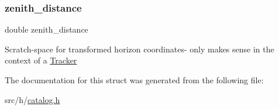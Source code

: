 \mbox{\label{struct_entry_a3c2f9054e85abef611e387ff641fe831}} 
\subsubsection{\texorpdfstring{zenith\+\_\+distance}{zenith\_distance}}
{\footnotesize\ttfamily double zenith\+\_\+distance}

Scratch-\/space for transformed horizon coordinates-\/ only makes sense in the context of a \mbox{\hyperlink{struct_tracker}{Tracker}} 

The documentation for this struct was generated from the following file\+:\begin{DoxyCompactItemize}
\item 
src/h/\mbox{\hyperlink{catalog_8h}{catalog.\+h}}\end{DoxyCompactItemize}
